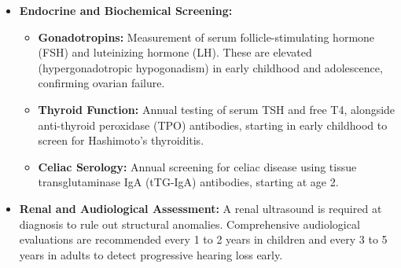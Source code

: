 \begin{itemize}
    \item \textbf{Endocrine and Biochemical Screening:}
    \begin{itemize}
        \item \textbf{Gonadotropins:} Measurement of serum follicle-stimulating hormone (FSH) and luteinizing hormone (LH). These are elevated (hypergonadotropic hypogonadism) in early childhood and adolescence, confirming ovarian failure.
        \item \textbf{Thyroid Function:} Annual testing of serum TSH and free T4, alongside anti-thyroid peroxidase (TPO) antibodies, starting in early childhood to screen for Hashimoto's thyroiditis.
        \item \textbf{Celiac Serology:} Annual screening for celiac disease using tissue transglutaminase IgA (tTG-IgA) antibodies, starting at age 2.
    \end{itemize}
    \item \textbf{Renal and Audiological Assessment:} A renal ultrasound is required at diagnosis to rule out structural anomalies. Comprehensive audiological evaluations are recommended every 1 to 2 years in children and every 3 to 5 years in adults to detect progressive hearing loss early.
\end{itemize}


